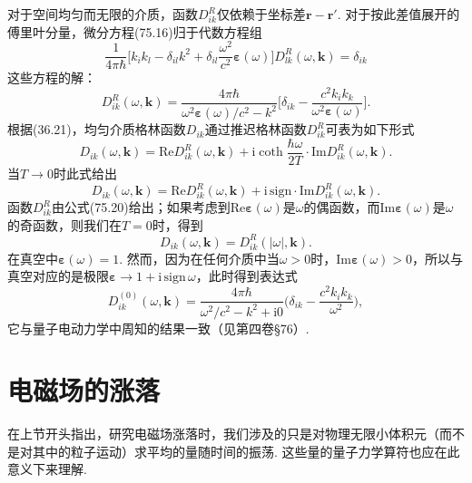 对于空间均匀而无限的介质，函数$D_{ik}^{R}$仅依赖于坐标差$\bm{r}-\bm{r}'$. 对于按此差值展开的傅里叶分量，微分方程(75.16)归于代数方程组
\begin{equation}
\frac{1}{4\pi\hbar}\biggl[k_{i}k_{l}-\delta_{il}k^{2}+\delta_{il}\frac{\omega^{2}}{c^{2}}\bm{\varepsilon}(\omega)\biggr]D_{lk}^{R}(\omega,\bm{k})=\delta_{ik}
\end{equation}
这些方程的解：
\begin{equation}
D_{ik}^{R}(\omega,\bm{k})=\frac{4\pi\hbar}{\omega^{2}\bm{\varepsilon}(\omega)/c^{2}-k^{2}}\biggl[\delta_{ik}-\frac{c^{2}k_{i}k_{k}}{\omega^{2}\bm{\varepsilon}(\omega)}\biggr].
\end{equation}
根据(36.21)，均匀介质格林函数$D_{ik}$通过推迟格林函数$D_{ik}^{R}$可表为如下形式
\begin{equation}
D_{ik}(\omega,\bm{k})=\mathrm{Re}D_{ik}^{R}(\omega,\bm{k})+\mathrm{i}\coth\frac{\hbar\omega}{2T}\cdot\mathrm{Im}D_{ik}^{R}(\omega,\bm{k}).
\end{equation}
当$T\to0$时此式给出
\begin{equation}
D_{ik}(\omega,\bm{k})=\mathrm{Re}D_{ik}^{R}(\omega,\bm{k})+\mathrm{i}\,\mathrm{sign}\cdot\mathrm{Im}D_{ik}^{R}(\omega,\bm{k}).
\end{equation}
函数$D_{ik}^{R}$由公式(75.20)给出；如果考虑到$\mathrm{Re}\bm{\varepsilon}(\omega)$是$\omega$的偶函数，而$\mathrm{Im}\bm{\varepsilon}(\omega)$是$\omega$的奇函数，则我们在$T=0$时，得到
\begin{equation}
D_{ik}(\omega,\bm{k})=D_{ik}^{R}(|\omega|,\bm{k}).
\end{equation}
在真空中$\bm{\varepsilon}(\omega)=1$. 然而，因为在任何介质中当$\omega>0$时，$\mathrm{Im}\bm{\varepsilon}(\omega)>0$，所以与真空对应的是极限$\bm{\varepsilon}\to1+\mathrm{i}\,\mathrm{sign}\,\omega$，此时得到表达式
\begin{equation*}
D_{ik}^{(0)}(\omega,\bm{k})=\frac{4\pi\hbar}{\omega^{2}/c^{2}-k^{2}+\mathrm{i}0}\biggl(\delta_{ik}-\frac{c^{2}k_{i}k_{k}}{\omega^{2}}\biggr),
\end{equation*}
它与量子电动力学中周知的结果一致（见第四卷§76）.

\section{电磁场的涨落}

在上节开头指出，研究电磁场涨落时，我们涉及的只是对物理无限小体积元（而不是对其中的粒子运动）求平均的量随时间的振荡. 这些量的量子力学算符也应在此意义下来理解.

